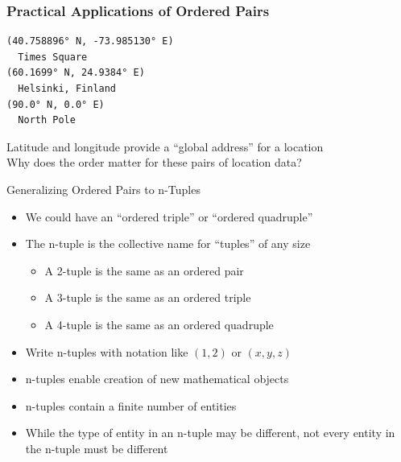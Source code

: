 \documentclass[14pt,aspectratio=169]{beamer}
\begin{document}
%
\begin{frame}[fragile]
  \frametitle{Practical Applications of Ordered Pairs}
  \begin{minipage}{6in}
    \vspace*{.25in}
    \begin{verbatim}
(40.758896° N, -73.985130° E)
  Times Square
(60.1699° N, 24.9384° E)
  Helsinki, Finland
(90.0° N, 0.0° E)
  North Pole
    \end{verbatim}
  \end{minipage}
  \vspace*{.05in}
  \begin{center}
    \normalsize \noindent Latitude and longitude provide a ``global address''
    for a location\\
    \normalsize \noindent Why does the order matter for these pairs of location
    data?\\
  \end{center}
\end{frame}

%
\begin{frame}{Generalizing Ordered Pairs to n-Tuples}
  \begin{itemize}
    \item We could have an ``ordered triple'' or ``ordered quadruple''
      \vspace*{-.15in}
    \item The n-tuple is the collective name for ``tuples'' of any size
      \begin{itemize}
        \item A 2-tuple is the same as an ordered pair
        \item A 3-tuple is the same as an ordered triple
        \item A 4-tuple is the same as an ordered quadruple
      \end{itemize}
      \vspace*{-.2in}
    \item Write n-tuples with notation like $(1,2)$ or $(x,y,z)$
      \vspace*{-.2in}
    \item n-tuples enable creation of new mathematical objects
      \vspace*{-.2in}
    \item n-tuples contain a finite number of entities
      \vspace*{-.2in}
    \item While the type of entity in an n-tuple may be different, not
      every entity in the n-tuple must be different
  \end{itemize}
\end{frame}
\end{document}
